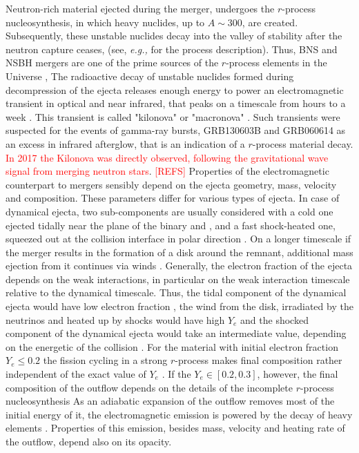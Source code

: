 \documentclass[11pt,a4paper,headinclude=true,DIV=14,BCOR=8mm,chapterprefix,listof=totoc,twoside,openright,abstracton]{scrbook}
\newcommand{\red}[1]{\textcolor{red}{#1}}
\begin{document}
Neutron-rich material ejected during the merger, undergoes the $r$-process nucleosynthesis, in which heavy nuclides, up to $A\sim 300$, are created. Subsequently, these unstable nuclides decay into the valley of stability after the neutron capture ceases, (see, \textit{e.g.,} \cite{Burbidge:1957} for the process description). 
%
Thus, BNS and NSBH mergers are one of the prime sources of the $r$-process elements in the Universe \cite{Argast:2003he,Shen:2015,VanDeVoort:2015,Ramirez-Ruiz:2014fsa}, 
%
The radioactive decay of unstable nuclides formed during decompression of the ejecta releases enough energy to power an electromagnetic transient in optical and near infrared, that peaks on a timescale from hours to a week \cite{Li:1998bw,Kulkarni:2005jw,Metzger:2010,Kasen:2013xka,Tanaka:2013ana}. 
This transient is called "kilonova" \cite{Metzger:2010} or "macronova" \cite{Kulkarni:2005jw}. 
Such transients were suspected for the events of gamma-ray bursts, GRB130603B \cite{Tanvir:2013pia,Berger:2013wna} and GRB060614 \cite{Yang:2015pha,Jin:2015txa} as an excess in infrared afterglow, that is an indication of a $r$-process material decay. \red{In 2017 the Kilonova was directly observed, following the gravitational wave signal from merging neutron stars}. \red{[REFS]} 
%
Properties of the electromagnetic counterpart to mergers sensibly depend on the ejecta geometry, mass, velocity and composition. These parameters differ for various types of ejecta. In case of dynamical ejecta, two sub-components are usually considered with a cold one ejected tidally near the plane of the binary and \cite{Lattimer:1977,Freiburghaus:1999}, and a fast shock-heated one, squeezed out at the collision interface in polar direction \cite{Bauswein:2013,Hotokezaka:2013b}. 
On a longer timescale if the merger results in the formation of a disk around the remnant, additional mass ejection from it continues via winds \cite{Fernandez:2013tya,Perego:2014fma,Just:2014}.
Generally, the electron fraction of the ejecta depends on the weak interactions, in particular on the weak interaction timescale relative to the dynamical timescale.
Thus, the tidal component of the dynamical ejecta would have low electron fraction \cite{Korobkin:2012uy}, the wind from the disk, irradiated by the neutrinos and heated up by shocks would have high $Y_e$ \cite{Just:2014,Richers:2015lma} and the shocked component of the dynamical ejecta would take an intermediate value, depending on the energetic of the collision \cite{Wanajo:2014,Goriely:2015fqa}. 
%
For the material with initial electron fraction $Y_e\leq 0.2$ the fission cycling in a strong $r$-process makes final composition rather independent of the exact value of $Y_e$ \cite{Metzger:2010,Roberts:2011,Goriely:2011vg}. 
If the $Y_e\in[0.2,0.3]$, however, the final composition of the outflow depends on the details of the incomplete $r$-process nucleosynthesis \cite{Korobkin:2012uy,Grossman:2013lqa,Kasen:2014toa}
%
As an adiabatic expansion of the outflow removes most of the initial energy of it, the electromagnetic emission is powered by the decay of heavy elements \cite{Metzger:2010}. 
Properties of this emission, besides mass, velocity and heating rate of the outflow, depend also on its opacity. 
\end{document}
